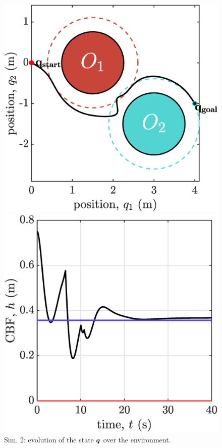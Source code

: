 \clearpage
\begin{figure}[!ht]
    \begin{minipage}[b]{0.46\linewidth}
    \includegraphics[width=\textwidth]{figures/sim2map.eps}
    \caption{\label{fig:sim2map}Sim. 2: evolution of the state ${\boldsymbol{q}}$ over the environment.}
    \end{minipage}
    \hfill
    \begin{minipage}[b]{0.46\linewidth}
    \includegraphics[width=\textwidth]{figures/sim2h.eps}

\end{minipage}
\end{figure}
